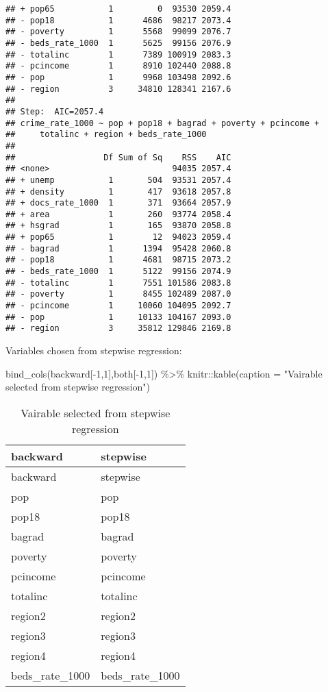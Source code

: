 \documentclass[
  11pt,
]{article}
\newenvironment{Shaded}{\begin{snugshade}}{\end{snugshade}}
\newcommand{\AttributeTok}[1]{\textcolor[rgb]{0.77,0.63,0.00}{#1}}
\newcommand{\DecValTok}[1]{\textcolor[rgb]{0.00,0.00,0.81}{#1}}
\newcommand{\FunctionTok}[1]{\textcolor[rgb]{0.00,0.00,0.00}{#1}}
\newcommand{\NormalTok}[1]{#1}
\newcommand{\SpecialCharTok}[1]{\textcolor[rgb]{0.00,0.00,0.00}{#1}}
\newcommand{\StringTok}[1]{\textcolor[rgb]{0.31,0.60,0.02}{#1}}
\begin{document}
\begin{verbatim}
## + pop65           1         0  93530 2059.4
## - pop18           1      4686  98217 2073.4
## - poverty         1      5568  99099 2076.7
## - beds_rate_1000  1      5625  99156 2076.9
## - totalinc        1      7389 100919 2083.3
## - pcincome        1      8910 102440 2088.8
## - pop             1      9968 103498 2092.6
## - region          3     34810 128341 2167.6
## 
## Step:  AIC=2057.4
## crime_rate_1000 ~ pop + pop18 + bagrad + poverty + pcincome + 
##     totalinc + region + beds_rate_1000
## 
##                  Df Sum of Sq    RSS    AIC
## <none>                         94035 2057.4
## + unemp           1       504  93531 2057.4
## + density         1       417  93618 2057.8
## + docs_rate_1000  1       371  93664 2057.9
## + area            1       260  93774 2058.4
## + hsgrad          1       165  93870 2058.8
## + pop65           1        12  94023 2059.4
## - bagrad          1      1394  95428 2060.8
## - pop18           1      4681  98715 2073.2
## - beds_rate_1000  1      5122  99156 2074.9
## - totalinc        1      7551 101586 2083.8
## - poverty         1      8455 102489 2087.0
## - pcincome        1     10060 104095 2092.7
## - pop             1     10133 104167 2093.0
## - region          3     35812 129846 2169.8
\end{verbatim}

Variables chosen from stepwise regression:

\begin{Shaded}
\begin{Highlighting}[]
\FunctionTok{bind\_cols}\NormalTok{(backward[}\SpecialCharTok{{-}}\DecValTok{1}\NormalTok{,}\DecValTok{1}\NormalTok{],both[}\SpecialCharTok{{-}}\DecValTok{1}\NormalTok{,}\DecValTok{1}\NormalTok{]) }\SpecialCharTok{\%\textgreater{}\%}\NormalTok{ knitr}\SpecialCharTok{::}\FunctionTok{kable}\NormalTok{(}\AttributeTok{caption =} \StringTok{"Vairable selected from stepwise regression"}\NormalTok{)}
\end{Highlighting}
\end{Shaded}

\begin{longtable}[]{@{}ll@{}}
\caption{Vairable selected from stepwise regression}\tabularnewline
\toprule
backward & stepwise \\
\midrule
\endfirsthead
\toprule
backward & stepwise \\
\midrule
\endhead
pop & pop \\
pop18 & pop18 \\
bagrad & bagrad \\
poverty & poverty \\
pcincome & pcincome \\
totalinc & totalinc \\
region2 & region2 \\
region3 & region3 \\
region4 & region4 \\
beds\_rate\_1000 & beds\_rate\_1000 \\
\bottomrule
\end{longtable}
\end{document}
